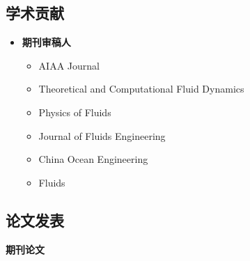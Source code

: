 \documentclass[10pt]{article}
\newenvironment{myitemize}
{ \begin{itemize}
    \setlength{\itemsep}{0pt}
    \setlength{\parskip}{0pt}
    \setlength{\parsep}{0pt}     }
{ \end{itemize}                  }
\begin{document}
\vspace{-0.1in}
\subsection*{学术贡献}
\begin{itemize}

\item {\bf 期刊审稿人}
	\begin{myitemize}
	\item AIAA Journal
  \item Theoretical and Computational Fluid Dynamics
	\item Physics of Fluids
	\item Journal of Fluids Engineering
	\item China Ocean Engineering
	\item Fluids
	\end{myitemize}
		\vspace{-0.1in}
		
\end{itemize}

\vspace{-0.1in}

\subsection*{论文发表}
{\bf \color{Blue}期刊论文}
\end{document}
